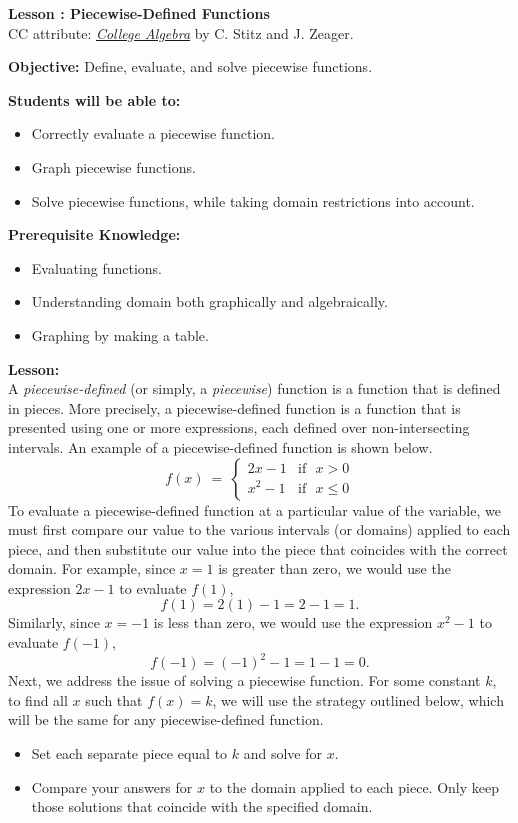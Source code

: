 \documentclass[12pt]{article}
\theoremstyle{definition}
\begin{document}
{\bf \large Lesson : Piecewise-Defined Functions}
\\ CC attribute: \href{http://www.stitz-zeager.com}{\it{College Algebra}} by C. Stitz and J. Zeager. 
\hfill \doclicenseImage[imagewidth=5em]\\
\par
{\bf Objective:} Define, evaluate, and solve piecewise functions.\\
\par
{\bf Students will be able to:}
\begin{itemize}
	\item Correctly evaluate a piecewise function.
	\item Graph piecewise functions.
	\item Solve piecewise functions, while taking domain restrictions into account.
\end{itemize}
{\bf Prerequisite Knowledge:}
\begin{itemize}
	\item Evaluating functions.
	\item Understanding domain both graphically and algebraically.
	\item Graphing by making a table.
\end{itemize}
\hrulefill

{\bf Lesson:}\\
A {\it piecewise-defined} (or simply, a {\it piecewise}) function is a function that is defined in pieces.  More precisely, a piecewise-defined function is a function that is presented using one or more expressions, each defined over non-intersecting intervals.  An example of a piecewise-defined function is shown below.
\[ f(x)~=~
	\begin{cases} 
      2x-1 & \text{if~~} x> 0\\
			x^2-1 & \text{if~~} x\leq 0
  \end{cases}
\]
To evaluate a piecewise-defined function at a particular value of the variable, we must first compare our value to the various intervals (or domains) applied to each piece, and then substitute our value into the piece that coincides with the correct domain.  For example, since $x=1$ is greater than zero, we would use the expression $2x-1$ to evaluate $f(1)$,
$$f(1)=2(1)-1=2-1=1.$$
Similarly, since $x=-1$ is less than zero, we would use the expression $x^2-1$ to evaluate $f(-1)$,
$$f(-1)=(-1)^2-1=1-1=0.$$
Next, we address the issue of solving a piecewise function.  For some constant $k$, to find all $x$ such that $f(x)=k$, we will use the strategy outlined below, which will be the same for any piecewise-defined function.
	\begin{itemize}
		\item Set each separate piece equal to $k$ and solve for $x$.
		\item Compare your answers for $x$ to the domain applied to each piece.  Only keep those solutions that coincide with the specified domain.
	\end{itemize}
\end{document}
